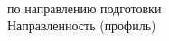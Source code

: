 \vspace{0pt plus2fill} %


{\centering%

	\MakeUppercase{\bfseries{}\DocType} \\
	\MakeUppercase{\thesisDegree}%


	{\centering%
		\MakeUppercase{\bfseries{\thesisTitle}}}%

}\par%

\noindent	по направлению подготовки \thesisSpecialtyCodeAndTitle{}\\%
\noindent	Направленность (профиль)	\thesisOPCodeAndTitle %
\par%





\vspace{4mm plus2fill}%

